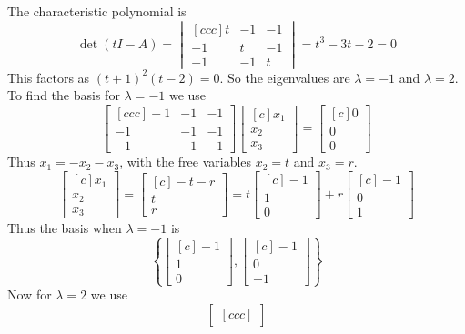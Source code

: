 \begin{solution}
The characteristic polynomial is
$$
\det(t I - A) =
\begin{vmatrix}[ccc]
t&-1&-1\\
-1&t &-1\\
-1&-1&t
\end{vmatrix}
=
t^3-3t - 2 = 0
$$
This factors as $(t+1)^2(t - 2)=0$. So the eigenvalues are $\lambda =-1$ and $\lambda = 2$. To find the basis for $\lambda = -1$ we use
$$
\begin{bmatrix}[ccc]
-1&-1&-1\\
-1&-1&-1\\
-1&-1&-1
\end{bmatrix}
\begin{bmatrix}[c]
x_1\\
x_2\\
x_3
\end{bmatrix}
=
\begin{bmatrix}[c]
0\\
0\\
0
\end{bmatrix}
$$
Thus $x_1 = -x_2-x_3$, with the free variables $x_2=t$ and $x_3=r$.
$$
\begin{bmatrix}[c]
x_1\\
x_2\\
x_3
\end{bmatrix}
=
\begin{bmatrix}[c]
-t-r\\
t\\
r
\end{bmatrix}
=
t
\begin{bmatrix}[c]
-1\\
1\\
0
\end{bmatrix} +r
\begin{bmatrix}[c]
-1\\
0\\
1
\end{bmatrix}
$$
Thus the basis when $\lambda = -1$ is
$$
\left\{
\begin{bmatrix}[c]
-1\\
1\\
0
\end{bmatrix},
\begin{bmatrix}[c]
-1\\
0\\
-1
\end{bmatrix}
\right\}
$$
Now for $\lambda = 2$ we use
$$
\begin{bmatrix}[ccc]

\end{bmatrix}$$
\end{solution}
